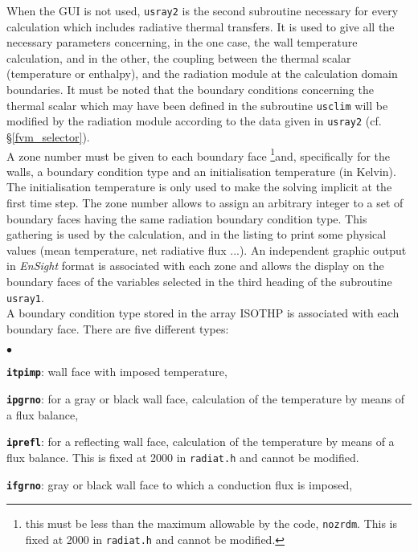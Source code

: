 {{{When the GUI is not used, \texttt{usray2} is the second subroutine necessary for every calculation which includes radiative thermal transfers. It is used to give all the
necessary parameters concerning, in the one case, the wall temperature
calculation, and in the other, the coupling between the thermal
scalar (temperature or enthalpy), and the radiation module at the
calculation domain boundaries. It must be noted that the boundary conditions
concerning the thermal scalar which may have been defined in the
subroutine \texttt{usclim} will be modified by the radiation module
according to the data given in \texttt{usray2} (cf. \S\ref{fvm_selector}).\\
A zone number must be given to each boundary face \footnote{this must be less
 than the maximum allowable by the code, \texttt{nozrdm}. This is fixed at 2000
 in \texttt{radiat.h} and cannot be modified.}and, specifically for
the walls, a boundary condition type and an initialisation temperature
(in Kelvin). The initialisation temperature is only used to make the
solving implicit at the first time step. The zone number allows to assign
an arbitrary integer to a set of boundary faces having the same
radiation boundary condition type. This gathering is used by the
calculation, and in the listing to print some physical values (mean
temperature, net radiative flux ...). An independent graphic output in
{\em EnSight} format is associated with each zone and allows the display on
the boundary faces of the variables selected in the third heading of the
subroutine \texttt{usray1}.\\
A boundary condition type stored in the array ISOTHP is associated with
each boundary face. There are five different types:

\begin{list}{$\bullet$}{}

\item \texttt{\textbf{itpimp}}: wall face with imposed temperature,

\item \texttt{\textbf{ipgrno}}: for a gray or black wall face, calculation of the
      temperature by means of a flux balance,

\item \texttt{\textbf{iprefl}}: for a reflecting wall face, calculation of the
      temperature by means of a flux balance.
 This is fixed at 2000 in \texttt{radiat.h} and cannot be modified.

\item \texttt{\textbf{ifgrno}}: gray or black wall face to which a conduction
      flux is imposed,


\end{list}}}}
